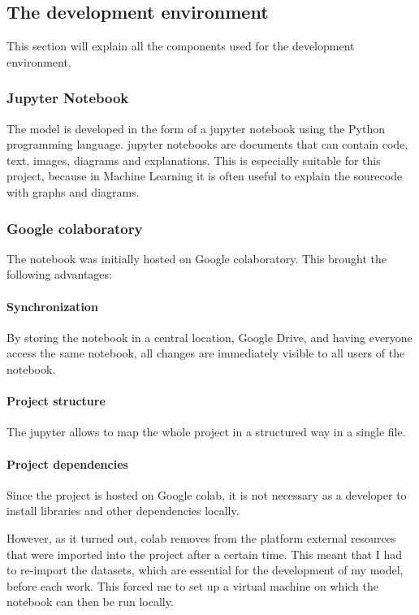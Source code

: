 \subsection{The development environment}
This section will explain all the components used for the development environment. 
\subsubsection{Jupyter Notebook}
The model is developed in the form of a \gls{jupyter} notebook using the Python programming language. \gls{jupyter} notebooks are documents that can contain code, text, images, diagrams and explanations. This is especially suitable for this project, because in Machine Learning it is often useful to explain the sourecode with graphs and diagrams.

\subsubsection{Google \gls{colab}oratory}
The notebook was initially hosted on Google \gls{colab}oratory\cite{colab}. This brought the following advantages:
\paragraph{Synchronization} 
By storing the notebook in a central location, Google Drive, and having everyone access the same notebook, all changes are immediately visible to all users of the notebook.
\paragraph{Project structure} 
The \gls{jupyter} allows to map the whole project in a structured way in a single file. 
\paragraph{Project dependencies}
Since the project is hosted on Google \gls{colab}, it is not necessary as a developer to install libraries and other dependencies locally.

However, as it turned out, \gls{colab} removes from the platform external resources that were imported into the project after a certain time. This meant that I had to re-import the datasets, which are essential for the development of my model, before each work. This forced me to set up a \gls{virtual machine} on which the notebook can then be run locally.

